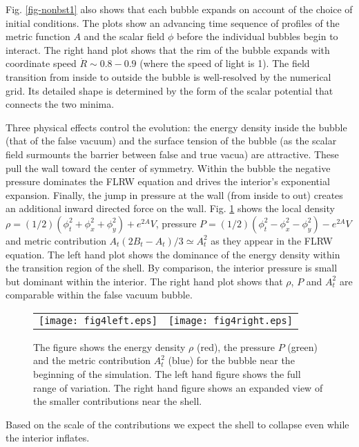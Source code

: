 \documentclass[preprintnumbers,eqsecnum,aps,prd,epsf,showpacs,nofootinbib
]{revtex4}
\begin{document}
Fig. \ref{fig-nonbst1} also shows that each bubble expands on account
of the choice of initial conditions. The plots show an advancing time
sequence of profiles of the metric function $A$ and the scalar field
$\phi$ before the individual bubbles begin to interact.  The right
hand plot shows that the rim of the bubble expands with coordinate
speed ${\dot R} \sim 0.8-0.9$ (where the speed of light is 1).  The
field transition from inside to outside the bubble is well-resolved by
the numerical grid. Its detailed shape is determined by the form of
the scalar potential that connects the two minima.

Three physical effects control the evolution: the energy density
inside the bubble (that of the false vacuum) and the surface tension
of the bubble (as the scalar field surmounts the barrier between false
and true vacua) are attractive. These pull the wall toward the center
of symmetry.  Within the bubble the negative pressure dominates the
FLRW equation and drives the interior's exponential
expansion. Finally, the jump in pressure at the wall (from inside to
out) creates an additional inward directed force on the
wall. Fig. \ref{forces} shows the local density $\rho = (1/2)
(\phi_t^2 + \phi_x^2 + \phi_y^2) + e^{2A} V$, pressure $P = (1/2)
(\phi_t^2 - \phi_x^2 - \phi_y^2) - e^{2A} V$ and metric contribution
$A_t(2B_t - A_t)/3 \simeq A_t^2$ as they appear in the FLRW equation.
The left hand plot shows the dominance of the energy density within
the transition region of the shell. By comparison, the interior
pressure is small but dominant within the interior. The right hand
plot shows that $\rho$, $P$ and $A_t^2$ are comparable within the
false vacuum bubble.
\begin{figure}
\begin{center}
\begin{tabular}{ll}
\texttt{[image: fig4left.eps]} &
\hspace{0.5cm}
\texttt{[image: fig4right.eps]}
\end{tabular}
\end{center}
\caption{The figure shows the energy density $\rho$ (red), the
  pressure $P$ (green) and the metric contribution $A_t^2$ (blue) for
  the bubble near the beginning of the simulation. The left hand
  figure shows the full range of variation. The right hand figure
  shows an expanded view of the smaller contributions near the shell.
  \label{forces}}
\end{figure}
Based on the scale of the contributions we expect the shell to collapse
even while the interior inflates.
\end{document}
